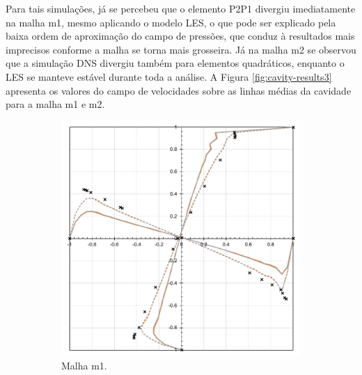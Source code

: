 Para tais simulações, já se percebeu que o elemento P2P1 divergiu imediatamente na malha m1, mesmo aplicando o modelo LES, o que pode ser explicado pela baixa ordem de aproximação do campo de pressões, que conduz à resultados mais imprecisos conforme a malha se torna mais grosseira. Já na malha m2 se observou que a simulação DNS divergiu também para elementos quadráticos, enquanto o LES se manteve estável durante toda a análise. A Figura \ref{fig:cavity-results3} apresenta os valores do campo de velocidades sobre as linhas médias da cavidade para a malha m1 e m2.

\begin{figure}[h!]
    \centering
    \caption{Cavidade bidimensional - Valores do campo de velocidades sobre as linhas médias para as malhas m1 e m2.}
    \begin{subfigure}{0.49\textwidth}
        \includegraphics[width=\linewidth]{Figuras/Cavity/res-m1.pdf}
        \caption{Malha m1.}
    \end{subfigure}
    \begin{subfigure}{0.49\textwidth}

\end{subfigure}
\end{figure}
